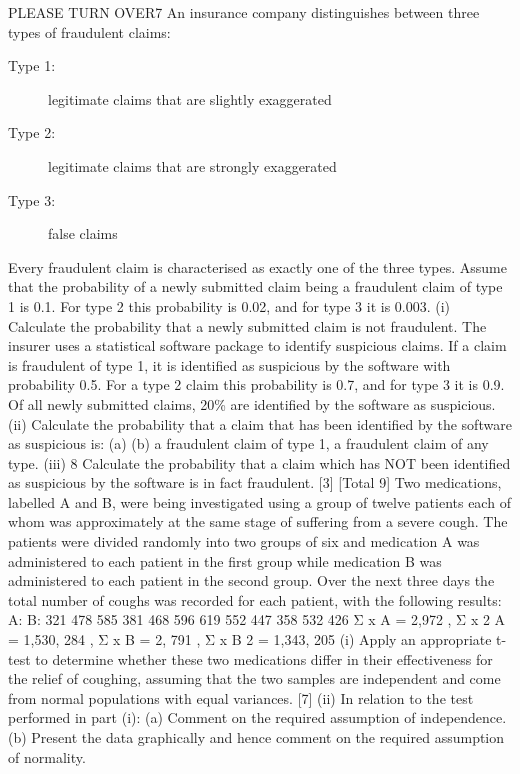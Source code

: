 \documentclass[a4paper,12pt]{article}
\begin{document}
\begin{enumerate}
PLEASE TURN OVER7
An insurance company distinguishes between three types of fraudulent claims:
\begin{description}
\item[Type 1:] legitimate claims that are slightly exaggerated
\item[Type 2:] legitimate claims that are strongly exaggerated
\item[Type 3:] false claims
\end{description}
Every fraudulent claim is characterised as exactly one of the three types. Assume that
the probability of a newly submitted claim being a fraudulent claim of type 1 is 0.1.
For type 2 this probability is 0.02, and for type 3 it is 0.003.
(i) Calculate the probability that a newly submitted claim is not fraudulent.
The insurer uses a statistical software package to identify suspicious claims. If a claim is fraudulent of type 1, it is identified as suspicious by the software with probability 0.5. For a type 2 claim this probability is 0.7, and for type 3 it is 0.9.
Of all newly submitted claims, 20\% are identified by the software as suspicious.
(ii)
Calculate the probability that a claim that has been identified by the software
as suspicious is:
(a)
(b)
a fraudulent claim of type 1,
a fraudulent claim of any type.
(iii)
8
Calculate the probability that a claim which has NOT been identified as
suspicious by the software is in fact fraudulent.
[3]
[Total 9]
Two medications, labelled A and B, were being investigated using a group of twelve patients each of whom was approximately at the same stage of suffering from a severe cough. The patients were divided randomly into two groups of six and medication A
was administered to each patient in the first group while medication B was administered to each patient in the second group. Over the next three days the total number of coughs was recorded for each patient, with the following results:
A:
B:
321
478
585
381
468
596
619
552
447
358
532
426
Σ x A = 2,972 , Σ x 2 A = 1,530, 284 , Σ x B = 2, 791 , Σ x B 2 = 1,343, 205
(i) Apply an appropriate t-test to determine whether these two medications differ in their effectiveness for the relief of coughing, assuming that the two samples are independent and come from normal populations with equal variances. [7]
(ii) In relation to the test performed in part (i):
(a) Comment on the required assumption of independence.
(b) Present the data graphically and hence comment on the required assumption of normality.

\end{enumerate}
\end{document}
